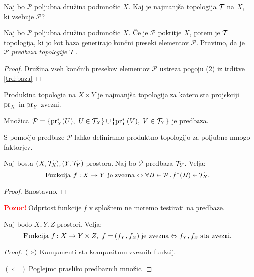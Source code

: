 Naj bo $\mathcal{P}$ poljubna družina podmnožic $X$. Kaj je najmanjša topologija $\mathcal{T}$ na $X$, ki vsebuje $\mathcal{P}$?

\begin{trditev}
    Naj bo $\mathcal{P}$ poljubna družina podmnožic $X$. Če je $\mathcal{P}$ pokritje $X$, potem je $\mathcal{T}$ topologija, ki jo kot baza generirajo končni preseki elementov $\mathcal{P}$.
    Pravimo, da je $\mathcal{P}$ \emph{predbaza topologije $\mathcal{T}$}.
\end{trditev}

\begin{proof}
    Družina vseh končnih presekov elementov $\mathcal{P}$ ustreza pogoju (2) iz trditve \ref{trd:baza}
\end{proof}

\begin{primer}
    Produktna topologia na $X \times Y$ je najmanjša topologija za katero sta projekciji $\operatorname{pr}_X$ in $\operatorname{pr}_Y$ zvezni. 
    
    Množica~$\mathcal{P} = \left\{\operatorname{pr}_X^{*}(U), \ U \in \mathcal{T}_X\right\} \cup \left\{\operatorname{pr}_Y^{*}(V), \ V \in \mathcal{T}_Y\right\}$ je predbaza. 

    S pomočjo predbaze $\mathcal{P}$ lahko definiramo produktno topologijo za poljubno mnogo faktorjev.
\end{primer}

\begin{trditev}
    Naj bosta $(X, \mathcal{T}_X), (Y, \mathcal{T}_Y)$ prostora. Naj bo $\mathcal{P}$ predbaza $\mathcal{T}_Y$. Velja:
    $$\text{Funkcija } f: X \to Y \text{ je zvezna} \Leftrightarrow \forall B \in \mathcal{P} \,.\, f^{*}(B) \in \mathcal{T}_X.$$
\end{trditev}

\begin{proof}
    Enostavno.
\end{proof}

\textbf{\textcolor{red}{Pozor!}} Odprtost funkcije $f$ v splošnem ne moremo testirati na predbaze.

\begin{trditev}
    Naj bodo $X, Y, Z$ prostori. Velja:
    $$\text{Funkcija } f:X \to Y \times Z, \ f = (f_Y, f_Z) \text{ je zvezna} \Leftrightarrow f_Y, f_Z \text{ sta zvezni}.$$
\end{trditev}

\begin{proof}
    $(\Rightarrow)$ Komponenti sta kompozitum zveznih funkcij.

    $(\Leftarrow)$ Poglejmo prasliko predbaznih množic.
\end{proof}

